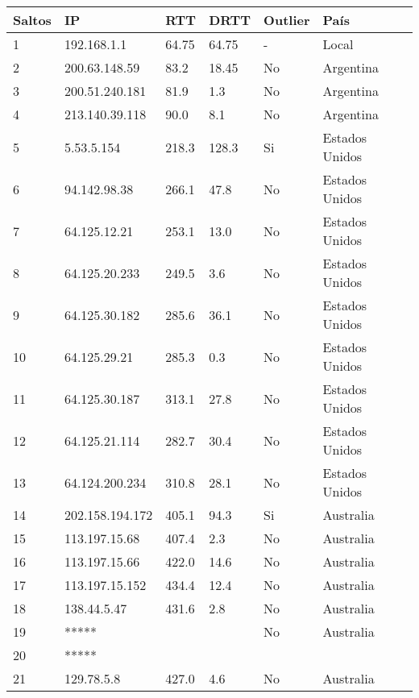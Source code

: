 \begin{center}
    \begin{tabular}{| l | l | l | l | l | l | }
    \hline
    Saltos & IP             & RTT    & DRTT   & Outlier & País       \\ \hline
    1    &    192.168.1.1     & 64.75 &  64.75 & -  & Local          \\ \hline 
    2    &    200.63.148.59   & 83.2  &  18.45 & No & Argentina      \\ \hline
    3    &    200.51.240.181  & 81.9  &  1.3   & No & Argentina      \\ \hline
    4    &    213.140.39.118  & 90.0  &  8.1   & No & Argentina      \\ \hline
    5    &    5.53.5.154      & 218.3 &  128.3 & Si & Estados Unidos \\ \hline
    6    &    94.142.98.38    & 266.1 &  47.8  & No & Estados Unidos \\ \hline
    7    &    64.125.12.21    & 253.1 &  13.0  & No & Estados Unidos \\ \hline
    8    &    64.125.20.233   & 249.5 &  3.6   & No & Estados Unidos \\ \hline
    9    &    64.125.30.182   & 285.6 &  36.1  & No & Estados Unidos \\ \hline
    10   &    64.125.29.21    & 285.3 &  0.3   & No & Estados Unidos \\ \hline
    11   &    64.125.30.187   & 313.1 &  27.8  & No & Estados Unidos \\ \hline
    12   &    64.125.21.114   & 282.7 &  30.4  & No & Estados Unidos \\ \hline
    13   &    64.124.200.234  & 310.8 &  28.1  & No & Estados Unidos \\ \hline
    14   &    202.158.194.172 & 405.1 &  94.3  & Si & Australia      \\ \hline
    15   &    113.197.15.68   & 407.4 &  2.3   & No & Australia      \\ \hline
    16   &    113.197.15.66   & 422.0 &  14.6  & No & Australia      \\ \hline
    17   &    113.197.15.152  & 434.4 &  12.4  & No & Australia      \\ \hline
    18   &    138.44.5.47     & 431.6 &  2.8   & No & Australia      \\ \hline
    19   &    *****           &       &        & No & Australia      \\ \hline
    20   &    *****           &       &        &    &                \\ \hline
    21   &    129.78.5.8      & 427.0 & 4.6    & No & Australia      \\ \hline
    \end{tabular}
\end{center}

